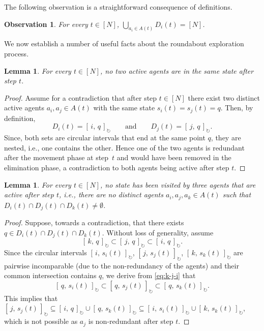 \documentclass[a4paper,11pt]{article}
\newtheorem{observation}[theorem]{Observation}
\newtheorem{lemma}[theorem]{Lemma}
\theoremstyle{definition}
\theoremstyle{remark}
\newcommand{\cint}[2]{[\,#1,\,#2\,]_{\circlearrowright}}
\begin{document}
	The following observation is a straightforward consequence of definitions.
	
	\begin{observation}\label{obs:all-states-visited}
		For every $t \in [N]$, $\bigcup_{a_i \in A(t)} D_i(t) = [N]$.
	\end{observation}
	
	We now establish a number of useful facts about the roundabout exploration process.
	
	\begin{lemma}\label{obs:diff-states}
		For every $t \in [N]$, no two active agents are in the same state after step $t$.
	\end{lemma}
	\begin{proof}
		Assume for a contradiction that after step $t\in[N]$ there exist two distinct active agents $a_i,a_j\in A(t)$ with the same state $s_i(t)=s_j(t)=q$. Then, by definition,
		\[
			D_i(t)=\cint{i}{q}
			\qquad\text{and}\qquad
			D_j(t)=\cint{j}{q}.
		\]
		Since, both sets are circular intervals that end at the same point $q$, they are nested, i.e., one contains the other. Hence one of the two agents is redundant after the movement phase at step~$t$ and would have been removed in the elimination phase, a contradiction to both agents being active after step $t$.
	\end{proof}
	
	\begin{lemma}\label{obs:1-state-3-agents}
		For every $t \in [N]$, no state has been visited by three agents that are active after step $t$, i.e., there are no distinct agents $a_i, a_j, a_k \in A(t)$ such that $D_i(t) \cap D_j(t) \cap D_k(t) \neq \emptyset$.
	\end{lemma}
	\begin{proof}
		Suppose, towards a contradiction, that there exists $q \in D_i(t) \cap D_j(t) \cap D_k(t)$. Without loss of generality, assume 
        \begin{equation}\label{eq:k-j-i}
            \cint{k}{q} \subset \cint{j}{q} \subset \cint{i}{q}.
        \end{equation}
		Since the circular intervals $\cint{i}{s_i(t)}$, $\cint{j}{s_j(t)}$, $\cint{k}{s_k(t)}$ are pairwise incomparable (due to the non-redundancy of the agents) and their common intersection contains $q$, we derive from \cref{eq:k-j-i} that 
		\[
			\cint{q}{s_i(t)} \subset \cint{q}{s_j(t)} \subset \cint{q}{s_k(t)}.
		\]
		This implies that $\cint{j}{s_j(t)} \subseteq \cint{i}{q} \cup \cint{q}{s_k(t)} \subseteq \cint{i}{s_i(t)} \cup \cint{k}{s_k(t)}$, which is not possible as $a_j$ is non-redundant after step $t$. 
	\end{proof}
	
\end{document}
